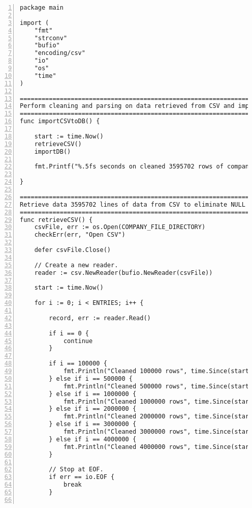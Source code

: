\begin{lstlisting}[breaklines, frame=single, numbers=left, caption={Parse and cleaned data retrieved from CSV}, label=commandline-02]
package main

import (
	"fmt" 
	"strconv"
	"bufio"
	"encoding/csv"
	"io"
	"os"
	"time"
)

==========================================================================================================
Perform cleaning and parsing on data retrieved from CSV and import processed data into PostgreSQL database
========================================================================================================== 
func importCSVtoDB() { 

	start := time.Now()
	retrieveCSV()
	importDB()
	
	fmt.Printf("%.5fs seconds on cleaned 3595702 rows of company data. \n", time.Since(start).Seconds())

}

==============================================================================================================
Retrieve data 3595702 lines of data from CSV to eliminate NULL values and standardize data in specific columns
==============================================================================================================
func retrieveCSV() {
	csvFile, err := os.Open(COMPANY_FILE_DIRECTORY)
	checkErr(err, "Open CSV")
	
	defer csvFile.Close()
	
	// Create a new reader.
	reader := csv.NewReader(bufio.NewReader(csvFile))
	
	start := time.Now()
	
	for i := 0; i < ENTRIES; i++ {
	
		record, err := reader.Read()
		
		if i == 0 {
			continue
		}
		
		if i == 100000 { 
			fmt.Println("Cleaned 100000 rows", time.Since(start).Seconds()) 
		} else if i == 500000 { 
			fmt.Println("Cleaned 500000 rows", time.Since(start).Seconds())
		} else if i == 1000000 { 
			fmt.Println("Cleaned 1000000 rows", time.Since(start).Seconds())
		} else if i == 2000000 { 
			fmt.Println("Cleaned 2000000 rows", time.Since(start).Seconds())
		} else if i == 3000000 { 
			fmt.Println("Cleaned 3000000 rows", time.Since(start).Seconds())
		} else if i == 4000000 { 
			fmt.Println("Cleaned 4000000 rows", time.Since(start).Seconds())
		}
		
		// Stop at EOF.
		if err == io.EOF {
			break
		}
		

\end{lstlisting}

